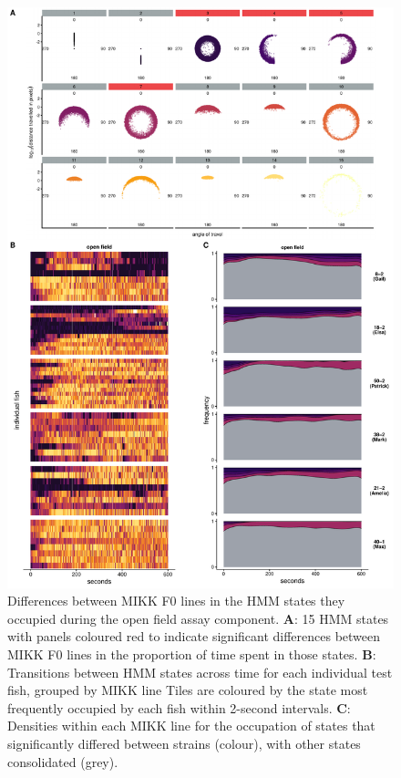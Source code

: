 \documentclass[
]{book}
\begin{document}
\begin{figure}
\includegraphics[width=1\linewidth]{figs/mikk_behaviour/select_0.08_15_sge_of} \caption{Differences between MIKK F0 lines in the HMM states they occupied during the open field assay component. \textbf{A}: 15 HMM states with panels coloured red to indicate significant differences between MIKK F0 lines in the proportion of time spent in those states. \textbf{B}: Transitions between HMM states across time for each individual test fish, grouped by MIKK line Tiles are coloured by the state most frequently occupied by each fish within 2-second intervals. \textbf{C}: Densities within each MIKK line for the occupation of states that significantly differed between strains (colour), with other states consolidated (grey).}\label{fig:F2-time-sge-of}
\end{figure}
\end{document}
